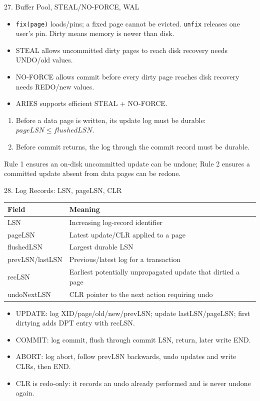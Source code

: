 \begin{topic}{27. Buffer Pool, STEAL/NO-FORCE, WAL}
\begin{itemize}
  \item \texttt{fix(page)} loads/pins; a fixed page cannot be evicted. \texttt{unfix} releases one user's pin. Dirty means memory is newer than disk.
  \item STEAL allows uncommitted dirty pages to reach disk \arr recovery needs UNDO/old values.
  \item NO-FORCE allows commit before every dirty page reaches disk \arr recovery needs REDO/new values.
  \item ARIES supports efficient STEAL + NO-FORCE.
\end{itemize}
\begin{enumerate}
  \item Before a data page is written, its update log must be durable:
  \(\boxed{pageLSN\le flushedLSN}\).
  \item Before commit returns, the log through the commit record must be durable.
\end{enumerate}
\why Rule 1 ensures an on-disk uncommitted update can be undone; Rule 2 ensures a committed update absent from data pages can be redone.
\end{topic}

\begin{topic}{28. Log Records: LSN, pageLSN, CLR}
\begin{tabularx}{\linewidth}{@{}lY@{}}
\toprule
Field & Meaning\\
\midrule
LSN & Increasing log-record identifier\\
pageLSN & Latest update/CLR applied to a page\\
flushedLSN & Largest durable LSN\\
prevLSN/lastLSN & Previous/latest log for a transaction\\
recLSN & Earliest potentially unpropagated update that dirtied a page\\
undoNextLSN & CLR pointer to the next action requiring undo\\
\bottomrule
\end{tabularx}
\begin{itemize}
  \item UPDATE: log XID/page/old/new/prevLSN; update lastLSN/pageLSN; first dirtying adds DPT entry with recLSN.
  \item COMMIT: log commit, flush through commit LSN, return, later write END.
  \item ABORT: log abort, follow prevLSN backwards, undo updates and write CLRs, then END.
  \item CLR is redo-only: it records an undo already performed and is never undone again.
\end{itemize}
\end{topic}

